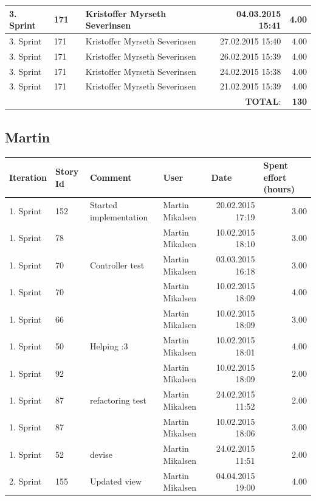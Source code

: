 \documentclass[a4paper]{article}
\begin{document}
\begin{landscape}
\begin{tabular}{|l|l|l|l|r|r|}
3. Sprint & 171 &  & Kristoffer Myrseth Severinsen & 04.03.2015 15:41 & 4.00 \\ \hline
3. Sprint & 171 &  & Kristoffer Myrseth Severinsen & 27.02.2015 15:40 & 4.00 \\ \hline
3. Sprint & 171 &  & Kristoffer Myrseth Severinsen & 26.02.2015 15:39 & 4.00 \\ \hline
3. Sprint & 171 &  & Kristoffer Myrseth Severinsen & 24.02.2015 15:38 & 4.00 \\ \hline
3. Sprint & 171 &  & Kristoffer Myrseth Severinsen & 21.02.2015 15:39 & 4.00 \\ \hline
 & & & &\textbf{TOTAL}: & \textbf{130} \\ \hline
\end{tabular}

\subsection{Martin}
\begin{tabular}{|l|l|l|l|r|r|}
\hline
\textbf{Iteration} & \textbf{Story Id} & \textbf{Comment} & \textbf{User} & \multicolumn{1}{l|}{\textbf{Date}} & \multicolumn{1}{l|}{\textbf{Spent effort (hours)}} \\ \hline
1. Sprint & 152 & Started implementation & Martin Mikalsen & 20.02.2015 17:19 & 3.00 \\ \hline
1. Sprint & 78 &  & Martin Mikalsen & 10.02.2015 18:10 & 3.00 \\ \hline
1. Sprint & 70 & Controller test & Martin Mikalsen & 03.03.2015 16:18 & 3.00 \\ \hline
1. Sprint & 70 &  & Martin Mikalsen & 10.02.2015 18:09 & 4.00 \\ \hline
1. Sprint & 66 &  & Martin Mikalsen & 10.02.2015 18:09 & 3.00 \\ \hline
1. Sprint & 50 & Helping :3  & Martin Mikalsen & 10.02.2015 18:01 & 4.00 \\ \hline
1. Sprint & 92 &  & Martin Mikalsen & 10.02.2015 18:09 & 2.00 \\ \hline
1. Sprint & 87 & refactoring test & Martin Mikalsen & 24.02.2015 11:52 & 2.00 \\ \hline
1. Sprint & 87 &  & Martin Mikalsen & 10.02.2015 18:06 & 3.00 \\ \hline
1. Sprint & 52 & devise & Martin Mikalsen & 24.02.2015 11:51 & 2.00 \\ \hline
2. Sprint & 155 & Updated view & Martin Mikalsen & 04.04.2015 19:00 & 4.00 \\ \hline

\end{tabular}
\end{landscape}
\end{document}
